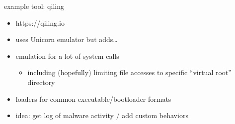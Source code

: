 \begin{frame}{example tool: qiling}
    \begin{itemize}
    \item https://qiling.io
    \item uses Unicorn emulator but adds\ldots
    \item emulation for a lot of system calls
        \begin{itemize}
        \item including (hopefully) limiting file accesses to specific ``virtual root'' directory
        \end{itemize}
    \item loaders for common executable/bootloader formats
    \vspace{.5cm}
    \item idea: get log of malware activity / add custom behaviors
    \end{itemize}
\end{frame}


